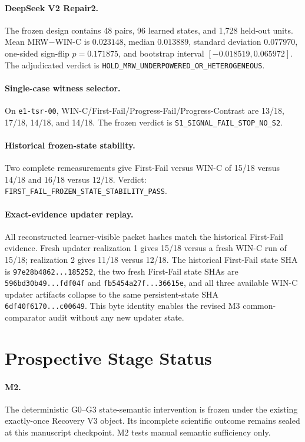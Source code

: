 \paragraph{DeepSeek V2 Repair2.}
The frozen design contains 48 pairs, 96 learned states, and 1,728 held-out units. Mean MRW$-$WIN-C is $0.023148$, median $0.013889$, standard deviation $0.077970$, one-sided sign-flip $p=0.171875$, and bootstrap interval $[-0.018519,0.065972]$. The adjudicated verdict is \texttt{HOLD\_MRW\_UNDERPOWERED\_OR\_HETEROGENEOUS}.

\paragraph{Single-case witness selector.}
On \texttt{e1-tsr-00}, WIN-C/First-Fail/Progress-Fail/Progress-Contrast are 13/18, 17/18, 14/18, and 14/18. The frozen verdict is \texttt{S1\_SIGNAL\_FAIL\_STOP\_NO\_S2}.

\paragraph{Historical frozen-state stability.}
Two complete remeasurements give First-Fail versus WIN-C of 15/18 versus 14/18 and 16/18 versus 12/18. Verdict: \texttt{FIRST\_FAIL\_FROZEN\_STATE\_STABILITY\_PASS}.

\paragraph{Exact-evidence updater replay.}
All reconstructed learner-visible packet hashes match the historical First-Fail evidence. Fresh updater realization 1 gives 15/18 versus a fresh WIN-C run of 15/18; realization 2 gives 11/18 versus 12/18. The historical First-Fail state SHA is \texttt{97e28b4862...185252}, the two fresh First-Fail state SHAs are \texttt{596bd30b49...fdf04f} and \texttt{fb5454a27f...36615e}, and all three available WIN-C updater artifacts collapse to the same persistent-state SHA \texttt{6df40f6170...c00649}. This byte identity enables the revised M3 common-comparator audit without any new updater state.

\section{Prospective Stage Status}
\label{app:prospective}

\paragraph{M2.}
The deterministic G0--G3 state-semantic intervention is frozen under the existing exactly-once Recovery V3 object. Its incomplete scientific outcome remains sealed at this manuscript checkpoint. M2 tests manual semantic sufficiency only.

